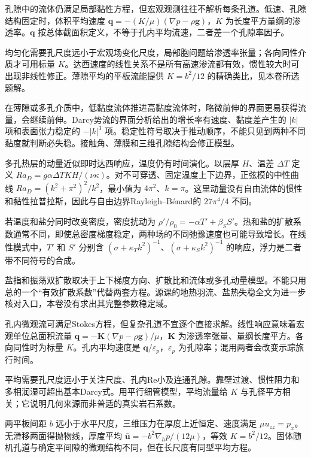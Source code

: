 孔隙中的流体仍满足局部黏性方程，但宏观观测往往不解析每条孔道。低速、孔隙结构固定时，体积平均速度 $\mathbf q=-(K/\mu)(\nabla p-\rho\mathbf g)$，$K$ 为长度平方量纲的渗透率。$\mathbf q$ 按总体截面积定义，不等于孔内平均流速，二者差一个孔隙率因子。

均匀化需要孔尺度远小于宏观场变化尺度，局部胞问题给渗透率张量；各向同性介质才可用标量 $K$。达西速度的线性关系不是所有高速渗流都有效，惯性较大时可出现非线性修正。薄隙平均的平板流能提供 $K=b^2/12$ 的精确类比，见本卷所选题解。

在薄隙或多孔介质中，低黏度流体推进高黏度流体时，略微前伸的界面更易获得流量，会继续前伸。Darcy势流的界面分析给出的增长率有速度、黏度差产生的 $|k|$ 项和表面张力稳定的 $-|k|^3$ 项。稳定性符号取决于推动顺序，不能只见到两种不同黏度就判断必失稳。接触角、薄膜和三维孔隙结构会修正模型。

多孔热层的动量近似即时达西响应，温度仍有时间演化。以层厚 $H$、温差 $\Delta T$ 定义 $Ra_D=g\alpha\Delta T KH/(\nu\kappa)$。对不可穿透、固定温度上下边界，正弦模的中性曲线 $Ra_D=(k^2+\pi^2)^2/k^2$，最小值为 $4\pi^2$、$k=\pi$。这里动量没有自由流体的惯性和黏性拉普拉斯，因此与自由边界Rayleigh--Bénard的 $27\pi^4/4$ 不同。

若温度和盐分同时改变密度，密度扰动为 $\rho'/\rho_0=-\alpha T'+\beta_S S'$。热和盐的扩散系数通常不同，即使总密度梯度稳定，两种场的不同弛豫速度也可能导致增长。在线性模式中，$T'$ 和 $S'$ 分别含 $(\sigma+\kappa_Tk^2)^{-1}$、$(\sigma+\kappa_Sk^2)^{-1}$ 的响应，浮力是二者带不同符号的合成。

盐指和振荡双扩散取决于上下梯度方向、扩散比和流体或多孔动量模型。不能只用总的一个“有效扩散系数”代替两套方程。源课的地热羽流、盐热失稳全文为进一步核对入口，本卷没有求出其完整参数稳定域。

孔内微观流可满足Stokes方程，但复杂孔道不宜逐个直接求解。线性响应意味着宏观单位总面积流量 $\mathbf q=-\mathbf K(\nabla p-\rho\mathbf g)/\mu$，$\mathbf K$ 为渗透率张量、量纲长度平方。各向同性时为标量 $K$。孔内平均速度是 $\mathbf q/\varepsilon_p$，$\varepsilon_p$ 为孔隙率；混用两者会改变示踪旅行时间。

平均需要孔尺度远小于关注尺度、孔内Re小及连通孔隙。靠壁过渡、惯性阻力和多相润湿可超出基本Darcy式。用平行细管模型，平均流量给 $K$ 与孔径平方相关；它说明几何来源而非普适的真实岩石系数。

两平板间距 $b$ 远小于水平尺度，三维压力在厚度上近恒定、速度满足 $\mu u_{zz}=p_x$。无滑移两面得抛物线，厚度平均 $\bar{\mathbf u}=-b^2\nabla_h p/(12\mu)$，等效 $K=b^2/12$。固体随机孔道与确定平间隙的微观结构不同，但在长尺度有同型平均方程。

